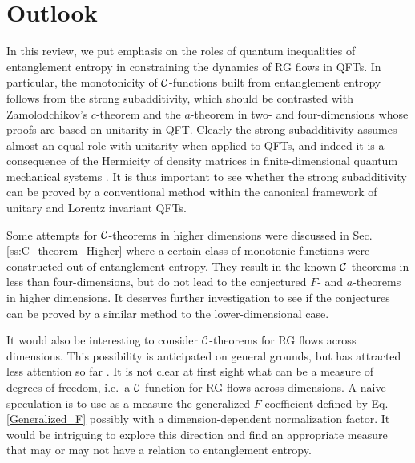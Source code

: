 \section{Outlook}\label{ss:Outlook}
In this review, we put emphasis on the roles of quantum inequalities of entanglement entropy in constraining the dynamics of RG flows in QFTs.
In particular, the monotonicity of ${\cal C}$-functions built from entanglement entropy follows from the strong subadditivity, which should be contrasted with Zamolodchikov's $c$-theorem and the $a$-theorem in two- and four-dimensions whose proofs are based on unitarity in QFT.
Clearly the strong subadditivity assumes almost an equal role with unitarity when applied to QFTs, and indeed it is a consequence of the Hermicity of density matrices in finite-dimensional quantum mechanical systems \cite{Lieb:1973cp,araki1976relative}.
It is thus important to see whether the strong subadditivity can be proved by a conventional method within the canonical framework of unitary and Lorentz invariant QFTs.

Some attempts for ${\cal C}$-theorems in higher dimensions were discussed in Sec. \ref{ss:C_theorem_Higher} where a certain class of monotonic functions were constructed out of entanglement entropy.
They result in the known ${\cal C}$-theorems in less than four-dimensions, but do not lead to the conjectured $F$- and $a$-theorems in higher dimensions.
It deserves further investigation to see if the conjectures can be proved by a similar method to the lower-dimensional case.

It would also be interesting to consider ${\cal C}$-theorems for RG flows across dimensions.
This possibility is anticipated on general grounds, but has attracted less attention so far \cite{Gukov:2015qea,Bobev:2017uzs}.
It is not clear at first sight what can be a measure of degrees of freedom, i.e.\, a ${\cal C}$-function for RG flows across dimensions.
A naive speculation is to use as a measure the generalized $F$ coefficient defined by Eq.\,\eqref{Generalized_F} possibly with a dimension-dependent normalization factor.
It would be intriguing to explore this direction and find an appropriate measure that may or may not have a relation to entanglement entropy.